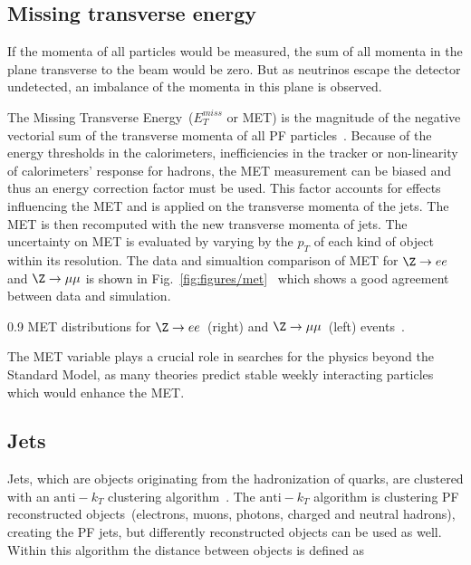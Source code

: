 \subsection{Missing transverse energy}


If the momenta of all particles would be measured, the sum of all momenta in the plane transverse to the beam would be zero. But as neutrinos escape the detector undetected, an imbalance of the momenta in this plane is observed. 

The Missing Transverse Energy~($E_{T}^{miss}$ or MET) is the magnitude of the negative vectorial sum of the transverse momenta of all PF particles~\cite{CMS:2016ljj}. Because of the energy thresholds in the calorimeters, inefficiencies in the tracker or non-linearity of calorimeters' response for hadrons, the MET measurement can be biased and thus an energy correction factor must be used. This factor accounts for effects influencing the MET and is applied on the transverse momenta of the jets. The MET is then recomputed with the new transverse momenta of jets. The uncertainty on MET is evaluated by varying by the $p_{T}$ of each kind of object within its resolution. The data and simualtion comparison of MET for  $\Z \rightarrow ee$ and $\Z \rightarrow \mu \mu$ is shown in Fig.~\ref{fig:figures/met}~\cite{CMS:2016ljj} which shows a good agreement between data and simulation.


                 {0.9}       %
                 { MET distributions for $\Z \rightarrow ee$~(right) and $\Z \rightarrow \mu \mu$~(left) events~\cite{CMS:2016ljj}. }

The MET variable plays a crucial role in searches for the physics beyond the Standard Model, as many theories predict stable weekly interacting particles which would enhance the MET.

\subsection{Jets}

Jets, which are objects originating from the hadronization of quarks, are clustered with an $\mathrm{anti-}k_{T}$ clustering algorithm~\cite{Cacciari:2008gp, Cacciari:2011ma}. The $\mathrm{anti-}k_{T}$ algorithm is clustering PF reconstructed objects~(electrons, muons, photons, charged and neutral hadrons), creating the PF jets, but differently reconstructed objects can be used as well. Within this algorithm the distance between objects is defined as

